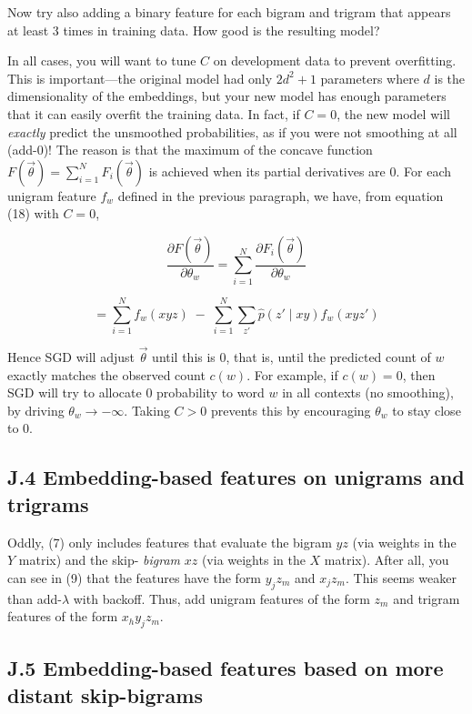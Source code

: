 \documentclass[12pt]{article}
\theoremstyle{plain}
\theoremstyle{definition}
\theoremstyle{remark}
\begin{document}
Now try also adding a binary feature for each bigram and trigram that appears at least 3 times in training 
data. How good is the resulting model? 

In all cases, you will want to tune $C$ on development data to prevent overfitting. This is important—the 
original model had only $2d^2 + 1$ parameters where $d$ is the dimensionality of the embeddings, but your new 
model has enough parameters that it can easily overfit the training data. In fact, if $C = 0$, the new model 
will \emph{exactly} predict the unsmoothed probabilities, as if you were not smoothing at all (add-0)! The reason 
is that the maximum of the concave function $F(\vec{\theta}) = \sum_{i=1}^N F_i(\vec{\theta})$ is achieved when its partial derivatives 
are 0. For each unigram feature $f_w$ defined in the previous paragraph, we have, from equation (18) with 
$C = 0$, 

\[
\frac{\partial F(\vec{\theta})}{\partial \theta_w} = \sum_{i=1}^N \frac{\partial F_i(\vec{\theta})}{\partial \theta_w} \tag{28}
\]

\[
= \sum_{i=1}^N f_w(xyz) \;-\; \sum_{i=1}^N \sum_{z'} \hat{p}(z' \mid xy) f_w(xyz') \tag{29}
\]

Hence SGD will adjust $\vec{\theta}$ until this is 0, that is, until the predicted count of $w$ exactly matches the observed 
count $c(w)$. For example, if $c(w) = 0$, then SGD will try to allocate 0 probability to word $w$ in all contexts 
(no smoothing), by driving $\theta_w \to -\infty$. Taking $C > 0$ prevents this by encouraging $\theta_w$ to stay close to 0. 

\subsection*{J.4 Embedding-based features on unigrams and trigrams}

Oddly, (7) only includes features that evaluate the bigram $yz$ (via weights in the $Y$ matrix) and the skip-
\emph{bigram} $xz$ (via weights in the $X$ matrix). After all, you can see in (9) that the features have the form $y_j z_m$ 
and $x_j z_m$. This seems weaker than add-$\lambda$ with backoff. Thus, add unigram features of the form $z_m$ and 
trigram features of the form $x_h y_j z_m$. 

\subsection*{J.5 Embedding-based features based on more distant skip-bigrams}
\end{document}
